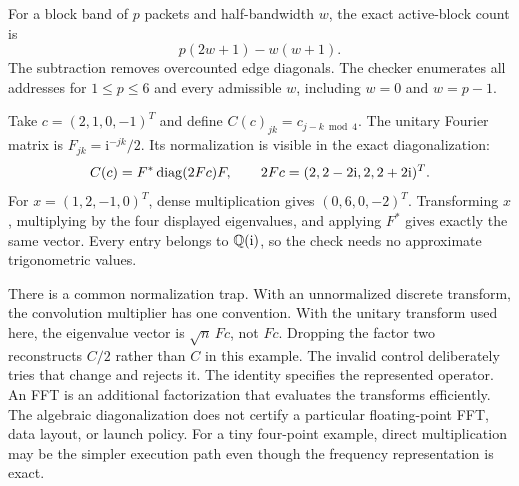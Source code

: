 For a block band of $p$ packets and half-bandwidth $w$, the exact active-block count is
\[
p(2w+1)-w(w+1).
\]
The subtraction removes overcounted edge diagonals. The checker enumerates all addresses for $1\le p\le6$ and every admissible $w$, including $w=0$ and $w=p-1$.

Take $c=(2,1,0,-1)^T$ and define $C(c)_{jk}=c_{j-k\bmod4}$. The unitary Fourier matrix is $F_{jk}=\mathrm i^{-jk}/2$. Its normalization is visible in the exact diagonalization:
\[
C(c)=F^*\operatorname{diag}(2Fc)F,\qquad 2Fc=(2,2-2\mathrm i,2,2+2\mathrm i)^T.
\]
For $x=(1,2,-1,0)^T$, dense multiplication gives $(0,6,0,-2)^T$. Transforming $x$, multiplying by the four displayed eigenvalues, and applying $F^*$ gives exactly the same vector. Every entry belongs to $\mathbb Q(\mathrm i)$, so the check needs no approximate trigonometric values.

There is a common normalization trap. With an unnormalized discrete transform, the convolution multiplier has one convention. With the unitary transform used here, the eigenvalue vector is $\sqrt n\,Fc$, not $Fc$. Dropping the factor two reconstructs $C/2$ rather than $C$ in this example. The invalid control deliberately tries that change and rejects it.
The identity specifies the represented operator. An FFT is an additional factorization that evaluates the transforms efficiently. The algebraic diagonalization does not certify a particular floating-point FFT, data layout, or launch policy. For a tiny four-point example, direct multiplication may be the simpler execution path even though the frequency representation is exact.

